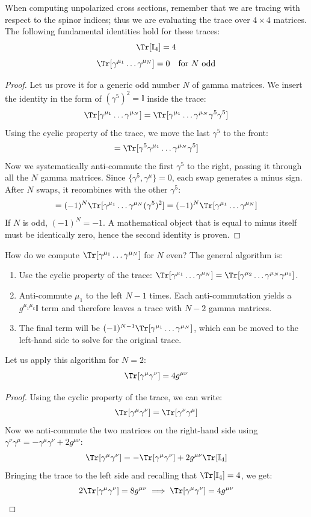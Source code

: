 When computing unpolarized cross sections, remember that we are tracing with respect to the spinor indices; thus we are evaluating the trace over \(4 \times 4\) matrices. The following fundamental identities hold for these traces:
\[
    \Tr [\mathbb{I}_4] = 4
\]
\[
    \Tr [\gamma^{\mu_1} \dots \gamma^{\mu_N}] = 0 \quad \text{for } N \text{ odd}
\]
\begin{proof}
    Let us prove it for a generic odd number \(N\) of gamma matrices. We insert the identity in the form of $(\gamma^5)^2 = \mathbb{I}$ inside the trace:
    \[
        \Tr [\gamma^{\mu_1} \dots \gamma^{\mu_N}] = \Tr [\gamma^{\mu_1} \dots \gamma^{\mu_N} \gamma^5 \gamma^5]
    \]
    Using the cyclic property of the trace, we move the last $\gamma^5$ to the front:
    \[
        = \Tr [\gamma^5 \gamma^{\mu_1} \dots \gamma^{\mu_N} \gamma^5]
    \]
    Now we systematically anti-commute the first $\gamma^5$ to the right, passing it through all the $N$ gamma matrices. Since $\{\gamma^5, \gamma^\mu\} = 0$, each swap generates a minus sign. After $N$ swaps, it recombines with the other $\gamma^5$:
    \[
        = (-1)^N \Tr [\gamma^{\mu_1} \dots \gamma^{\mu_N} (\gamma^5)^2] = (-1)^N \Tr [\gamma^{\mu_1} \dots \gamma^{\mu_N}]
    \]
    If $N$ is odd, $(-1)^N = -1$. A mathematical object that is equal to minus itself must be identically zero, hence the second identity is proven.
\end{proof}

\begin{remark}
    How do we compute $\Tr[\gamma^{\mu_1} \dots \gamma^{\mu_N}]$ for $N$ even? The general algorithm is:
    \begin{enumerate}
        \item Use the cyclic property of the trace: $\Tr[\gamma^{\mu_1} \dots \gamma^{\mu_N}] = \Tr[\gamma^{\mu_2} \dots \gamma^{\mu_N} \gamma^{\mu_1}]$.
        \item Anti-commute $\mu_1$ to the left $N-1$ times. Each anti-commutation yields a $g^{\mu_1 \mu_k}\mathbb{I}$ term and therefore leaves a trace with $N-2$ gamma matrices.
        \item The final term will be $(-1)^{N-1} \Tr[\gamma^{\mu_1} \dots \gamma^{\mu_N}]$, which can be moved to the left-hand side to solve for the original trace.
    \end{enumerate}
\end{remark}

Let us apply this algorithm for $N=2$:
\[
    \Tr [\gamma^\mu \gamma^\nu] = 4 g^{\mu \nu}
\]
\begin{proof}
    Using the cyclic property of the trace, we can write:
    \[
        \Tr [\gamma^\mu \gamma^\nu] = \Tr [\gamma^\nu \gamma^\mu]
    \]
    Now we anti-commute the two matrices on the right-hand side using $\gamma^\nu \gamma^\mu = -\gamma^\mu \gamma^\nu + 2g^{\mu\nu}$:
    \[
        \Tr [\gamma^\mu \gamma^\nu] = - \Tr [\gamma^\mu \gamma^\nu] + 2 g^{\mu \nu} \Tr [\mathbb{I}_4]
    \]
    Bringing the trace to the left side and recalling that $\Tr[\mathbb{I}_4] = 4$, we get:
    \[
        2 \Tr [\gamma^\mu \gamma^\nu] = 8 g^{\mu \nu} \implies \Tr [\gamma^\mu \gamma^\nu] = 4 g^{\mu \nu}
    \]
\end{proof}

